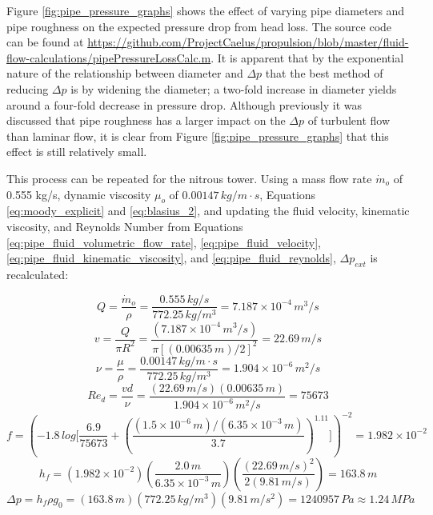 \documentclass[9pt]{article} %
\numberwithin{equation}{section} %
\begin{document}
Figure \ref{fig:pipe_pressure_graphs} shows the effect of varying pipe diameters and pipe roughness on the expected pressure drop from head loss. The source code can be found at \url{https://github.com/ProjectCaelus/propulsion/blob/master/fluid-flow-calculations/pipePressureLossCalc.m}. It is apparent that by the exponential nature of the relationship between diameter and $\Delta p$ that the best method of reducing $\Delta p$ is by widening the diameter; a two-fold increase in diameter yields around a four-fold decrease in pressure drop. Although previously it was discussed that pipe roughness has a larger impact on the $\Delta p$ of turbulent flow than laminar flow, it is clear from Figure \ref{fig:pipe_pressure_graphs} that this effect is still relatively small.

This process can be repeated for the nitrous tower. Using a mass flow rate $\dot{m}_{o}$ of 0.555 kg/s, dynamic viscosity $\mu_{o}$ of $0.00147 \, kg/m \cdot s$, Equations \ref{eq:moody_explicit} and \ref{eq:blasius_2}, and updating the fluid velocity, kinematic viscosity, and Reynolds Number from Equations \ref{eq:pipe_fluid_volumetric_flow_rate}, \ref{eq:pipe_fluid_velocity}, \ref{eq:pipe_fluid_kinematic_viscosity}, and \ref{eq:pipe_fluid_reynolds}, $\Delta p_{ext}$ is recalculated:

\begin{equation*}
Q = \frac{\dot{m}_{o}}{\rho} = \frac{0.555\, kg/s}{772.25\, kg/m^{3}} = 7.187 \times 10^{-4}\, m^{3}/s
\end{equation*}
\begin{equation*}
v = \frac{Q}{\pi R^{2}} = \frac{(7.187 \times 10^{-4}\, m^{3}/s)}{\pi [(0.00635\, m) / 2]^{2}} = 22.69\, m/s
\end{equation*}
\begin{equation*}
\nu = \frac{\mu}{\rho} = \frac{0.00147\, kg/m \cdot s}{772.25\, kg/m^{3}} = 1.904 \times 10^{-6}\, m^{2}/s
\end{equation*}
\begin{equation*}
Re_{d} = \frac{v d}{\nu} = \frac{(22.69\, m/s)(0.00635\, m)}{1.904 \times 10^{-6}\, m^{2}/s} = 75673
\end{equation*}
\begin{equation*}
f = \left( -1.8\, log \Bigg[ \frac{6.9}{75673} + \left( \frac{(1.5 \times 10^{-6}\, m)/(6.35 \times 10^{-3}\, m)}{3.7} \right) ^{1.11} \Bigg] \right)^{-2} = 1.982 \times 10^{-2}
\end{equation*}
\begin{equation*}
h_{f} = (1.982 \times 10^{-2}) \left( \frac{2.0\, m}{6.35 \times 10^{-3}\, m} \right) \left( \frac{(22.69\, m/s)^{2}}{2 (9.81\, m/s)} \right) = 163.8 \, m
\end{equation*}
\begin{equation*}
\Delta p = h_{f} \rho g_{0} = (163.8 \, m)(772.25 \, kg/m^{3})(9.81 \, m/s^{2}) = 1240957 \, Pa \approx 1.24 \, MPa
\end{equation*}
\end{document}

